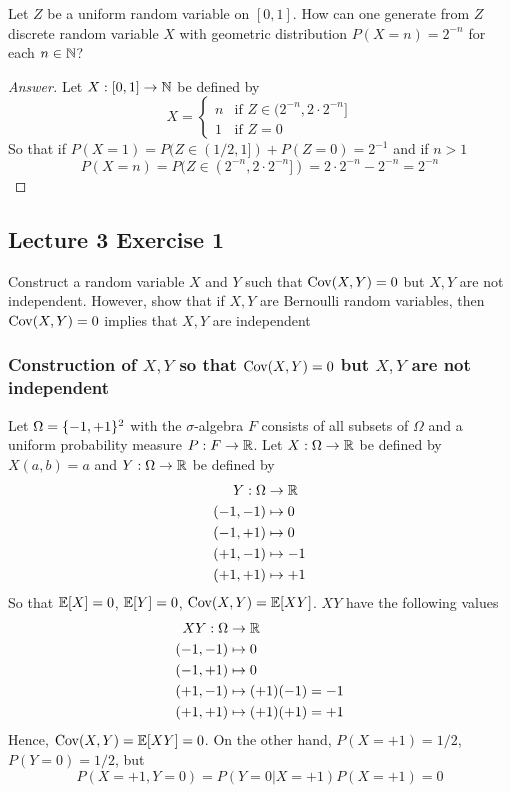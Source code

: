 \documentclass{article}
\begin{document}
Let $Z$ be a uniform random variable on $[0, 1]$. How can one generate from $Z$ discrete random variable $X$ with geometric distribution $P(X=n) = 2^{-n}$ for each $n \in \mathbb{N}$?

\begin{proof}[Answer]
    Let $X: [0, 1] \to \mathbb{N}$ be defined by
    $$
        X = \begin{cases}
            n &\text{if $Z \in (2^{-n}, 2 \cdot 2^{-n}]$} \\
            1 &\text{if $Z = 0$}
        \end{cases}    
    $$
    So that if $P(X = 1) = P(Z \in (1/2, 1]) + P(Z = 0) = 2^{-1}$ and if $n > 1$
    $$
        P(X = n) = P(Z \in (2^{-n}, 2 \cdot 2^{-n}]) = 2 \cdot 2^{-n} - 2^{-n} = 2^{-n}
    $$
    
\end{proof}

\subsection{Lecture 3 Exercise 1}

Construct a random variable $X$ and $Y$ such that $\operatorname{Cov}(X, Y) = 0$ but $X, Y$ are not independent. However, show that if $X, Y$ are Bernoulli random variables, then $\operatorname{Cov}(X, Y) = 0$ implies that $X, Y$ are independent

\subsubsection{Construction of $X, Y$ so that $\operatorname{Cov}(X, Y) = 0$ but $X, Y$ are not independent}

Let $\Omega = \{-1, +1\}^2$ with the $\sigma$-algebra $F$ consists of all subsets of $\Omega$ and a uniform probability measure $P: F \to \mathbb{R}$. Let $X: \Omega \to \mathbb{R}$ be defined by $X(a, b) = a$ and $Y: \Omega \to \mathbb{R}$ be defined by
\begin{align*}
    Y: \Omega &\to \mathbb{R} \\
    (-1, -1) &\mapsto 0 \\
    (-1, +1) &\mapsto 0 \\
    (+1, -1) &\mapsto -1 \\
    (+1, +1) &\mapsto +1
\end{align*}
So that $\mathbb{E}[X] = 0$, $\mathbb{E}[Y] = 0$, $\operatorname{Cov}(X, Y) = \mathbb{E}[XY]$. $XY$ have the following values
\begin{align*}
    XY: \Omega &\to \mathbb{R} \\
    (-1, -1) &\mapsto 0 \\
    (-1, +1) &\mapsto 0 \\
    (+1, -1) &\mapsto (+1)(-1) = -1 \\
    (+1, +1) &\mapsto (+1)(+1) = +1 \\
\end{align*}
Hence, $\operatorname{Cov}(X, Y) = \mathbb{E}[XY] = 0$. On the other hand, $P(X=+1) = 1/2$, $P(Y=0) = 1/2$, but
$$
    P(X=+1, Y=0) = P(Y=0 | X=+1) P(X=+1) = 0
$$
\end{document}
